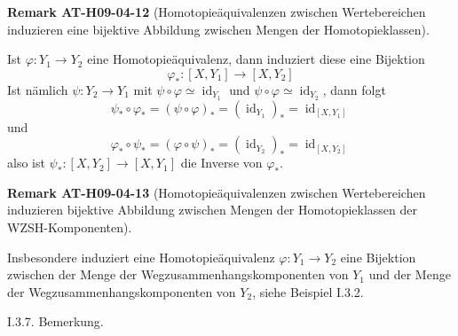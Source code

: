 \documentclass[10pt, letterpaper]{article}
\newcommand{\CustomHeading}[3]{%
  \par\medskip\noindent%
  \textbf{#1 #2} \textnormal{(#3)}.\enskip%
}
\newenvironment{REM}[2]{\begin{unitbox}\CustomHeading{Remark}{#1}{#2}}{\end{unitbox}}
\begin{document}
\begin{REM}{AT-H09-04-12}{Homotopieäquivalenzen zwischen Wertebereichen induzieren eine bijektive Abbildung zwischen Mengen der Homotopieklassen}
Ist $\varphi: Y_{1} \rightarrow Y_{2}$ eine Homotopieäquivalenz, dann induziert diese eine Bijektion $$\varphi_{*}:\left[X, Y_{1}\right] \rightarrow\left[X, Y_{2}\right]$$
Ist nämlich $\psi: Y_{2} \rightarrow Y_{1}$ mit $\psi \circ \varphi \simeq \operatorname{id}_{Y_{1}}$ und $\psi \circ \varphi \simeq \operatorname{id}_{Y_{2}}$, dann folgt 
$$\psi_{*} \circ \varphi_{*}=(\psi \circ\varphi)_{*}=\left(\operatorname{id}_{Y_{1}}\right)_{*}=\operatorname{id}_{\left[X, Y_{1}\right]}$$ 
und 
$$\varphi_{*} \circ \psi_{*}=(\varphi \circ \psi)_{*}=\left(\operatorname{id}_{Y_{2}}\right)_{*}=\operatorname{id}_{\left[X, Y_{2}\right]}$$
also ist $\psi_{*}:\left[X, Y_{2}\right] \rightarrow\left[X, Y_{1}\right]$ die Inverse von $\varphi_{*}$.
\end{REM}

\begin{REM}{AT-H09-04-13}{Homotopieäquivalenzen zwischen Wertebereichen induzieren bijektive Abbildung zwischen Mengen der Homotopieklassen der WZSH-Komponenten}
Insbesondere induziert eine Homotopieäquivalenz $\varphi: Y_{1} \rightarrow Y_{2}$ eine Bijektion zwischen der Menge der Wegzusammenhangskomponenten von $Y_{1}$ und der Menge der Wegzusammenhangskomponenten von $Y_{2}$, siehe Beispiel I.3.2.
\end{REM}


I.3.7. Bemerkung. 
\end{document}
